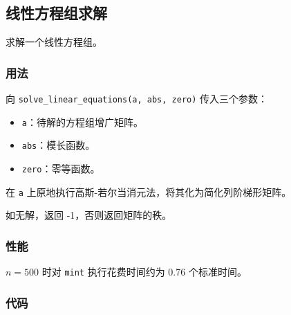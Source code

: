 \subsection{线性方程组求解}

求解一个线性方程组。

\subsubsection{用法}

向 \lstinline{solve_linear_equations(a, abs, zero)} 传入三个参数：
\begin{itemize}
\item \lstinline{a}：待解的方程组增广矩阵。
\item \lstinline{abs}：模长函数。
\item \lstinline{zero}：零等函数。
\end{itemize}

在 \lstinline{a} 上原地执行高斯-若尔当消元法，将其化为简化列阶梯形矩阵。

如无解，返回 -1，否则返回矩阵的秩。

\subsubsection{性能}

$n = 500$ 时对 \lstinline{mint} 执行花费时间约为 0.76 个标准时间。

\subsubsection{代码}


